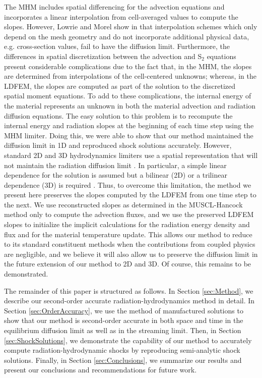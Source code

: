 \documentclass[preprint,12pt]{elsarticle}
\begin{document}
The MHM includes spatial differencing for the advection equations and incorporates a linear interpolation from cell-averaged values to compute the slopes.  However, Lowrie and Morel show in \cite{lowriemorel} that interpolation schemes which only depend on the mesh geometry and do not incorporate additional physical data, e.g. cross-section values, fail to have the diffusion limit.  Furthermore, the differences in spatial discretization between the advection and S$_2$ equations present considerable complications due to the fact that, in the MHM, the slopes are determined from interpolations of the cell-centered unknowns; whereas, in the LDFEM, the slopes are computed as part of the solution to the discretized spatial moment equations.  To add to these complications, the internal energy of the material represents an unknown in both the material advection and radiation diffusion equations.  The easy solution to this problem is to recompute the internal energy and radiation slopes at the beginning of each time step using the MHM limiter.  Doing this, we were able to show that our method maintained the diffusion limit in 1D and reproduced shock solutions accurately.  However, standard 2D and 3D hydrodynamics limiters use a spatial representation that will not maintain the radiation diffusion limit \cite{zjwang}.  In particular, a simple linear dependence for the solution is assumed but a bilinear (2D) or a trilinear dependence (3D) is required \cite{adams}.  Thus, to overcome this limitation, the method we present here preserves the slopes computed by the LDFEM from one time step to the next.  We use reconstructed slopes as determined in the MUSCL-Hancock method only to compute the advection fluxes, and we use the preserved LDFEM slopes to initialize the implicit calculations for the radiation energy density and flux and for the material temperature update.  This allows our method to reduce to its standard constituent methods when the contributions from coupled physics are negligible, and we believe it will also allow us to preserve the diffusion limit in the future extension of our method to 2D and 3D. Of course, this remains to be demonstrated.


The remainder of this paper is structured as follows.  In Section \ref{sec:Method}, we describe our second-order accurate radiation-hydrodynamics method in detail.  In Section \ref{sec:OrderAccuracy}, we use the method of manufactured solutions to show that our method is second-order accurate in both space and time in the equilibrium diffusion limit as well as in the streaming limit.  Then, in Section \ref{sec:ShockSolutions}, we demonstrate the capability of our method to accurately compute radiation-hydrodynamic shocks by reproducing semi-analytic shock solutions.  Finally, in Section \ref{sec:Conclusions}, we summarize our results and present our conclusions and recommendations for future work.
\end{document}
